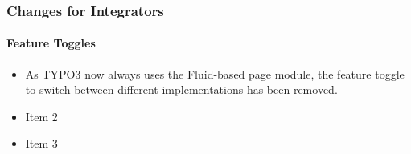 %

\begin{frame}[fragile]
	\frametitle{Changes for Integrators}
	\framesubtitle{Feature Toggles}

	\begin{itemize}
		\item As TYPO3 now always uses the Fluid-based page module, the feature
			toggle to switch between different implementations has been removed.
		\item Item 2
		\item Item 3
	\end{itemize}

\end{frame}

